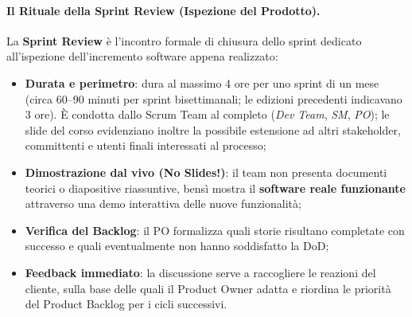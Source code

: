 \documentclass[12pt]{extarticle}
\begin{document}
\paragraph{Il Rituale della Sprint Review (Ispezione del Prodotto).}
La \textbf{Sprint Review} è l'incontro formale di chiusura dello sprint dedicato all'ispezione dell'incremento software appena realizzato:
\begin{itemize}
    \item \textbf{Durata e perimetro}: dura al massimo 4 ore per uno sprint di un mese (circa 60--90 minuti per sprint bisettimanali; le edizioni precedenti indicavano 3 ore). È condotta dallo Scrum Team al completo (\textit{Dev Team}, \textit{SM}, \textit{PO}); le slide del corso evidenziano inoltre la possibile estensione ad altri stakeholder, committenti e utenti finali interessati al processo;
    \item \textbf{Dimostrazione dal vivo (No Slides!)}: il team non presenta documenti teorici o diapositive riassuntive, bensì mostra il \textbf{software reale funzionante} attraverso una demo interattiva delle nuove funzionalità;
    \item \textbf{Verifica del Backlog}: il PO formalizza quali storie risultano completate con successo e quali eventualmente non hanno soddisfatto la DoD;
    \item \textbf{Feedback immediato}: la discussione serve a raccogliere le reazioni del cliente, sulla base delle quali il Product Owner adatta e riordina le priorità del Product Backlog per i cicli successivi.
\end{itemize}
\end{document}
